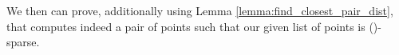 \begin{isabellebody}
\begin{isamarkuptext}
\begin{lemma} \label{lemma:set_band_filter}
 \vskip 0pt
 \vskip 0pt
 \vskip 0pt
 \vskip 0pt
\end{lemma}

We then can prove, additionally using Lemma \ref{lemma:find_closest_pair_dist}, that  computes
indeed a pair of points  such that our given list of points  is ()-sparse.


\end{isamarkuptext}
\end{isabellebody}
